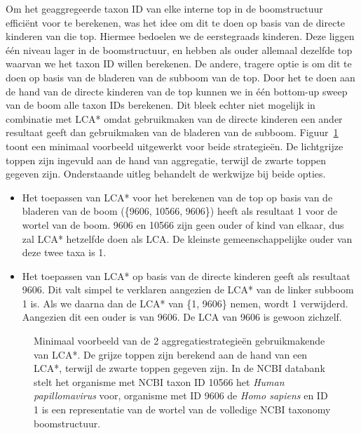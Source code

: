 Om het geaggregeerde taxon ID van elke interne top in de boomstructuur efficiënt voor te berekenen, was het idee om dit te doen op basis van de directe kinderen van die top.
Hiermee bedoelen we de eerstegraads kinderen.
Deze liggen één niveau lager in de boomstructuur, en hebben als ouder allemaal dezelfde top waarvan we het taxon ID willen berekenen.
De andere, tragere optie is om dit te doen op basis van de bladeren van de subboom van de top.
Door het te doen aan de hand van de directe kinderen van de top kunnen we in één bottom-up sweep van de boom alle taxon IDs berekenen.
Dit bleek echter niet mogelijk in combinatie met LCA* omdat gebruikmaken van de directe kinderen een ander resultaat geeft dan gebruikmaken van de bladeren van de subboom.
Figuur~\ref{fig:lca*_diff} toont een minimaal voorbeeld uitgewerkt voor beide strategieën.
De lichtgrijze toppen zijn ingevuld aan de hand van aggregatie, terwijl de zwarte toppen gegeven zijn.
Onderstaande uitleg behandelt de werkwijze bij beide opties.
\begin{itemize}
    \item Het toepassen van LCA* voor het berekenen van de top op basis van de bladeren van de boom (\{9606, 10566, 9606\}) heeft als resultaat 1 voor de wortel van de boom.
    9606 en 10566 zijn geen ouder of kind van elkaar, dus zal LCA* hetzelfde doen als LCA\@.
    De kleinste gemeenschappelijke ouder van deze twee taxa is 1.
    \item Het toepassen van LCA* op basis van de directe kinderen geeft als resultaat 9606.
    Dit valt simpel te verklaren aangezien de LCA* van de linker subboom 1 is.
    Als we daarna dan de LCA* van \{1, 9606\} nemen, wordt 1 verwijderd.
    Aangezien dit een ouder is van 9606.
    De LCA van 9606 is gewoon zichzelf.
\end{itemize}

\begin{figure}[h]
    \centering
    \hspace{0.25\textwidth}%
    \caption{Minimaal voorbeeld van de 2 aggregatiestrategieën gebruikmakende van LCA*. De grijze toppen zijn berekend aan de hand van een LCA*, terwijl de zwarte toppen gegeven zijn. In de NCBI databank stelt het organisme met NCBI taxon ID 10566 het \textit{Human papillomavirus} voor, organisme met ID 9606 de \textit{Homo sapiens} en ID 1 is een representatie van de wortel van de volledige NCBI taxonomy boomstructuur.}\label{fig:lca*_diff}
\end{figure}

